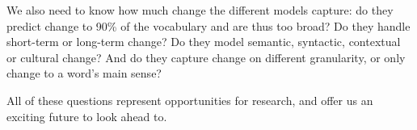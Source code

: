 \begin{refsection}
We also need to know how much change the different models capture: do they predict change to 90\% of the vocabulary and are thus too broad? Do they handle short-term or long-term change? Do they model semantic, syntactic, contextual or cultural change? And do they capture change on different granularity, or only change to a word's main sense?

All of these questions represent opportunities for research, and offer us an exciting future to look ahead to. 

{\sloppy\printbibliography[heading=subbibliography]}
\end{refsection}
